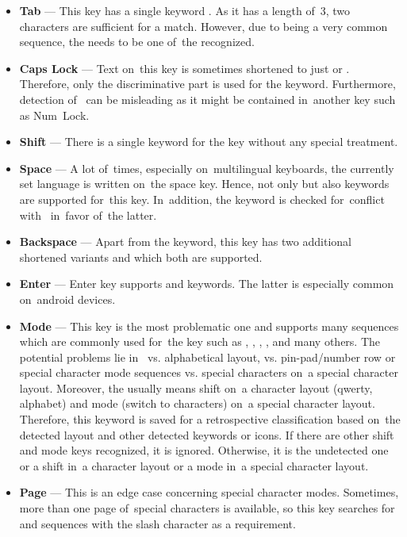 \begin{itemize}[topsep=0pt,itemsep=-1.5pt,partopsep=6pt]
  \item \textbf{Tab} --- This key has a single keyword . As it has a length of~3, two characters are sufficient for a match. However, due to  being a very common sequence, the  needs to be one of~the recognized.
  \item \textbf{Caps Lock} --- Text on~this key is sometimes shortened to just  or . Therefore, only the discriminative part  is used for the keyword. Furthermore, detection of~ can be misleading as it might be contained in~another key such as Num~Lock.
  \item \textbf{Shift} --- There is a single keyword  for the key without any special treatment.
  \item \textbf{Space} --- A lot of~times, especially on~multilingual keyboards, the currently set language is written on~the space key. Hence, not only  but also  keywords are supported for~this key. In~addition, the  keyword is checked for~conflict with~ in~favor of~the latter.
  \item \textbf{Backspace} --- Apart from the  keyword, this key has two additional shortened variants  and  which both are supported.
  \item \textbf{Enter} --- Enter key supports  and  keywords. The latter is especially common on~android devices.
  \item \textbf{Mode} --- This key is the most problematic one and supports many sequences which are commonly used for~the key such as , , , , \say{\#+=} and many others. The potential problems lie in~ vs. alphabetical layout,  vs. pin-pad/number row or special character mode sequences vs. special characters on~a special character layout. Moreover, the  usually means shift on~a character layout (qwerty, alphabet) and mode (switch to characters) on~a special character layout. Therefore, this keyword is saved for a retrospective classification based on~the detected layout and other detected keywords or icons. If there are other shift and mode keys recognized, it is ignored. Otherwise, it is the undetected one or a shift in~a character layout or a mode in~a special character layout.
  \item \textbf{Page} --- This is an edge case concerning special character modes. Sometimes, more than one page of~special characters is available, so this key searches for~ and  sequences with the slash character as a requirement.
\end{itemize}

